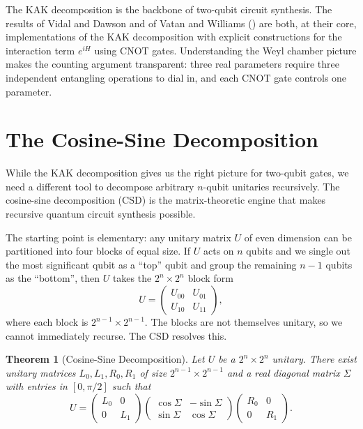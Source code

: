 \documentclass[12pt, a4paper, oneside]{report}
\theoremstyle{plain}
\newtheorem{theorem}{Theorem}[chapter]
\theoremstyle{definition}
\theoremstyle{remark}
\begin{document}
The KAK decomposition is the backbone of two-qubit circuit synthesis. The results of Vidal
and Dawson and of Vatan and Williams () are both, at their core,
implementations of the KAK decomposition with explicit constructions for the interaction
term $e^{iH}$ using CNOT gates. Understanding the Weyl chamber picture makes the counting
argument transparent: three real parameters require three independent entangling operations
to dial in, and each CNOT gate controls one parameter.


\section{The Cosine-Sine Decomposition}

While the KAK decomposition gives us the right picture for two-qubit gates, we need a
different tool to decompose arbitrary $n$-qubit unitaries recursively. The cosine-sine
decomposition (CSD) is the matrix-theoretic engine that makes recursive quantum circuit
synthesis possible.

The starting point is elementary: any unitary matrix $U$ of even dimension can be partitioned
into four blocks of equal size. If $U$ acts on $n$ qubits and we single out the most
significant qubit as a ``top'' qubit and group the remaining $n-1$ qubits as the ``bottom'',
then $U$ takes the $2^n \times 2^n$ block form
\[
  U = \begin{pmatrix} U_{00} & U_{01} \\ U_{10} & U_{11} \end{pmatrix},
\]
where each block is $2^{n-1} \times 2^{n-1}$. The blocks are not themselves unitary, so we
cannot immediately recurse. The CSD resolves this.

\begin{theorem}[Cosine-Sine Decomposition]
\label{thm:csd}
Let $U$ be a $2^n \times 2^n$ unitary. There exist unitary matrices $L_0, L_1, R_0, R_1$
of size $2^{n-1} \times 2^{n-1}$ and a real diagonal matrix $\Sigma$ with entries in
$[0, \pi/2]$ such that
\[
  U
  = \begin{pmatrix} L_0 & 0 \\ 0 & L_1 \end{pmatrix}
    \begin{pmatrix} \cos\Sigma & -\sin\Sigma \\ \sin\Sigma & \cos\Sigma \end{pmatrix}
    \begin{pmatrix} R_0 & 0 \\ 0 & R_1 \end{pmatrix}.
\]
\end{theorem}
\end{document}
